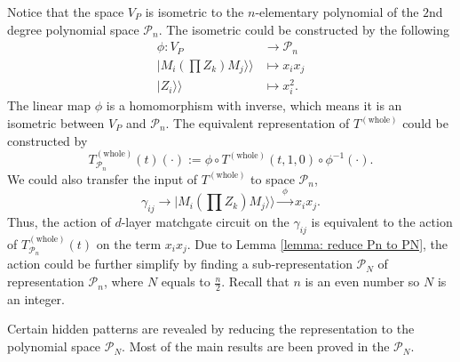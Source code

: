 \documentclass{article}
\newcommand{\Twhole}{T^{(\text{whole})}}
\newcommand{\supket}[1]{|#1 \rangle\rangle}
\begin{document}
Notice that the space $V_P$ is isometric to the $n$-elementary polynomial of the $2$nd degree polynomial space $\mathcal{P}_n$. The isometric could be constructed by the following
\begin{equation}
    \begin{aligned}
        \phi : V_P &\to \mathcal{P}_n \\
        \supket{M_i(\prod Z_k)M_j} &\mapsto x_i x_j \\
        \supket{Z_i} &\mapsto x_i^2.
    \end{aligned}
\end{equation}
The linear map $\phi$ is a homomorphism with inverse, which means it is an isometric between $V_P$ and $\mathcal{P}_n$. The equivalent representation of $\Twhole$ could be constructed by
\begin{equation}
    \Twhole_{\mathcal{P}_n}(t) (\cdot) := \phi \circ \Twhole(t,1,0) \circ \phi^{-1} (\cdot).
\end{equation}
We could also transfer the input of $\Twhole$ to space $\mathcal{P}_n$,
\begin{equation}
    \gamma_{ij} \longrightarrow \supket{M_i(\prod Z_k)M_j} \xrightarrow{~~\phi~~} x_i x_j.
\end{equation}
Thus, the action of $d$-layer matchgate circuit on the $\gamma_{ij}$ is equivalent to the action of $\Twhole_{\mathcal{P}_n}(t)$ on the term $x_i x_j$. 
Due to Lemma \ref{lemma: reduce Pn to PN}, the action could be further simplify by finding a sub-representation $\mathcal{P}_N$ of representation $\mathcal{P}_n$, where $N$ equals to $\frac{n}{2}$. Recall that $n$ is an even number so $N$ is an integer. 

Certain hidden patterns are revealed by reducing the representation to the polynomial space $\mathcal{P}_N$. Most of the main results are been proved in the $\mathcal{P}_N$. 
\end{document}

